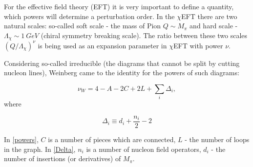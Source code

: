 For the effective field theory (EFT) it is very important to 
define a quantity, which powers will determine a perturbation order.
In the $\chi$EFT there are two natural scales: so-called soft scale -
the mass of Pion $Q \sim M_\pi$ and hard scale -
$\Lambda_\chi \sim 1~GeV$ (chiral symmetry breaking scale).
The ratio between these two scales $(Q/\Lambda_\chi)^\nu$
is being used as an expansion parameter in  $\chi$EFT with power
$\nu$.

Considering so-called irreducible (the diagrams that cannot be split
by cutting nucleon lines), Weinberg \cite{WEINBERG1990,WEINBERG1991}
came to the identity for the powers of such diagrams\cite{Machleidt2011}:

\begin{equation}
    \nu_W = 4 - A - 2C + 2L + \sum_i \Delta_i,
    \label{powers}
\end{equation}
where

\begin{equation}
    \Delta_i \equiv d_i + \frac{n_i}{2} - 2
    \label{Delta}
\end{equation}

In \ref*{powers}, $C$ is a number of pieces which are connected, $L$ - the number of loops in the graph.
In \ref*{Delta}, $n_i$ is a number of nucleon field operators, $d_i$ - the number of insertions
(or derivatives) of  $M_\pi$.